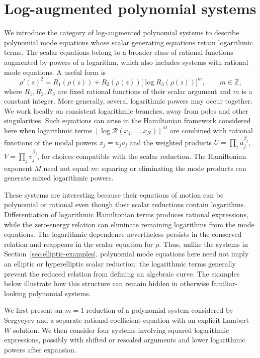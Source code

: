 \documentclass[11pt,a4paper]{article}
\numberwithin{equation}{section}
\begin{document}
\section{Log-augmented polynomial systems}
\label{sec:lotka-volterra-related}

We introduce the category of log-augmented polynomial systems to describe polynomial mode equations whose scalar generating equations retain logarithmic terms. The scalar equations belong to a broader class of rational functions augmented by powers of a logarithm, which also includes systems with rational mode equations. A useful form is
\begin{equation}
    \rho'(z)^2=R_1(\rho(z))+R_2(\rho(z))\bigl[\log R_3(\rho(z))\bigr]^m,
    \qquad m\in\mathbb Z,
    \label{eq:log-augmented-scalar}
\end{equation}
where $R_1,R_2,R_3$ are fixed rational functions of their scalar argument and $m$ is a constant integer. More generally, several logarithmic powers may occur together. We work locally on consistent logarithmic branches, away from poles and other singularities. Such equations can arise in the Hamiltonian framework considered here when logarithmic terms $[\log \mathcal R(x_1,\ldots,x_N)]^M$ are combined with rational functions of the modal powers $x_j=u_jv_j$ and the weighted products $U=\prod_j u_j^{\beta_j}$, $V=\prod_j v_j^{\beta_j}$, for choices compatible with the scalar reduction. The Hamiltonian exponent $M$ need not equal $m$: squaring or eliminating the mode products can generate mixed logarithmic powers.

These systems are interesting because their equations of motion can be polynomial or rational even though their scalar reductions contain logarithms. Differentiation of logarithmic Hamiltonian terms produces rational expressions, while the zero-energy relation can eliminate remaining logarithms from the mode equations. The logarithmic dependence nevertheless persists in the conserved relation and reappears in the scalar equation for $\rho$. Thus, unlike the systems in Section~\ref{sec:elliptic-examples}, polynomial mode equations here need not imply an elliptic or hyperelliptic scalar reduction: the logarithmic terms generally prevent the reduced relation from defining an algebraic curve. The examples below illustrate how this structure can remain hidden in otherwise familiar-looking polynomial systems.

We first present an $m=1$ reduction of a polynomial system considered by Sergyeyev \cite{sergyeyevCouplingConstantMetamorphosis2012} and a separate rational-coefficient equation with an explicit Lambert $W$ solution. We then consider four systems involving squared logarithmic expressions, possibly with shifted or rescaled arguments and lower logarithmic powers after expansion.
\end{document}
